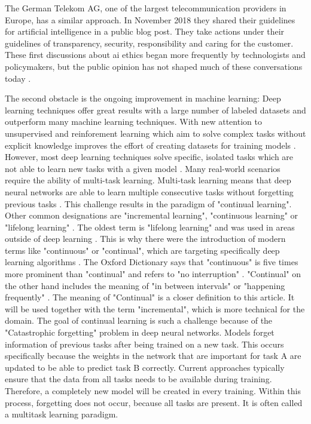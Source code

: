 \cite{google-ai-principles}
\hfill \break
The German Telekom AG, one of the largest telecommunication providers in Europe, has a similar approach.
In November 2018 they shared their guidelines for artificial intelligence in a public blog post.
They take actions under their guidelines of transparency, security, responsibility and caring for the customer.
\cite{telekom-ai-guidelines}
\hfill \break
These first discussions about \acrshort{ai} ethics began more frequently by technologists and policymakers, but the public opinion has not shaped much of these conversations today \cite{governanceai_public_report}.

The second obstacle is the ongoing improvement in machine learning:
\hfill \break
Deep learning techniques offer great results with a large number of labeled datasets and outperform many machine learning techniques.
With new attention to unsupervised and reinforement learning which aim to solve complex tasks without explicit knowledge improves the effort of creating datasets for training models \cite{continual-ai-blog, alphastar}.
However, most deep learning techniques solve specific, isolated tasks which are not able to learn new tasks with a given model \cite{continual-ai-blog}.
Many real-world scenarios require the ability of multi-task learning.
Multi-task learning means that deep neural networks are able to learn multiple consecutive tasks without forgetting previous tasks \cite{elastic-weight-consolidation}.
This challenge results in the paradigm of "continual learning".
Other common designations are "incremental learning", "continuous learning" or "lifelong learning" \cite{lifelong-machine-learning-book, continual-ai-blog}.
The oldest term is "lifelong learning" and was used in areas outside of deep learning \cite{continual-ai-blog}.
This is why there were the introduction of modern terms like "continuous" or "continual", which are targeting specifically deep learning algorithms \cite{continual-ai-blog}.
The Oxford Dictionary says that "continuous" is five times more prominent than "continual" and refers to "no interruption" \cite{oxford-continual-continuous}. "Continual" on the other hand includes the meaning of "in between intervals" or "happening frequently" \cite{oxford-continual-continuous}.
The meaning of "Continual" is a closer definition to this article.
It will be used together with the term "incremental", which is more technical for the domain.
\hfill \break
The goal of continual learning is such a challenge because of the "Catastrophic forgetting" problem in deep neural networks.
Models forget information of previous tasks after being trained on a new task.
This occurs specifically because the weights in the network that are important for task A are updated to be able to predict task B correctly.
Current approaches typically ensure that the data from all tasks needs to be available during training.
Therefore, a completely new model will be created in every training.
Within this process, forgetting does not occur, because
all tasks are present.
It is often called a multitask learning paradigm.
\cite{incremental-moment-matching, continual-ai-blog}

